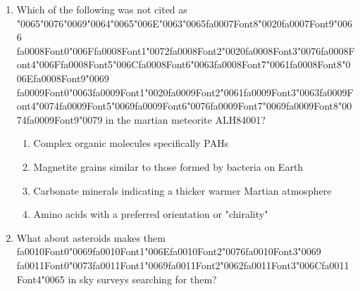 \documentclass[12pt]{article}
\begin{document}
\begin{enumerate}[label=\arabic*.]
\begin{enumerate}[label=(\alph*)]
    \item ancient heavily cratered highlands
    \item dark lavas inside volcanic calderas
    \item dark lavas filling older impact basins
    \item the bright regions on the Moon
\end{enumerate}
\item Which of the following was not cited as {\char"0065}{\char"0076}{\char"0069}{\char"0064}{\char"0065}{\char"006E}{\char"0063}{\char"0065}{\csname fa0007Font8\endcsname\char"0020}{\csname fa0007Font9\endcsname\char"0066} {\csname fa0008Font0\endcsname\char"006F}{\csname fa0008Font1\endcsname\char"0072}{\csname fa0008Font2\endcsname\char"0020}{\csname fa0008Font3\endcsname\char"0076}{\csname fa0008Font4\endcsname\char"006F}{\csname fa0008Font5\endcsname\char"006C}{\csname fa0008Font6\endcsname\char"0063}{\csname fa0008Font7\endcsname\char"0061}{\csname fa0008Font8\endcsname\char"006E}{\csname fa0008Font9\endcsname\char"0069} {\csname fa0009Font0\endcsname\char"0063}{\csname fa0009Font1\endcsname\char"0020}{\csname fa0009Font2\endcsname\char"0061}{\csname fa0009Font3\endcsname\char"0063}{\csname fa0009Font4\endcsname\char"0074}{\csname fa0009Font5\endcsname\char"0069}{\csname fa0009Font6\endcsname\char"0076}{\csname fa0009Font7\endcsname\char"0069}{\csname fa0009Font8\endcsname\char"0074}{\csname fa0009Font9\endcsname\char"0079} in the martian meteorite
ALH84001?
\begin{enumerate}[label=(\alph*)]
    \item Complex organic molecules specifically PAHs
    \item Magnetite grains similar to those formed by bacteria on Earth
    \item Carbonate minerals indicating a thicker warmer Martian atmosphere
    \item Amino acids with a preferred orientation or "chirality"
\end{enumerate}
\item What about asteroids makes them {\csname fa0010Font0\endcsname\char"0069}{\csname fa0010Font1\endcsname\char"006E}{\csname fa0010Font2\endcsname\char"0076}{\csname fa0010Font3\endcsname\char"0069} {\csname fa0011Font0\endcsname\char"0073}{\csname fa0011Font1\endcsname\char"0069}{\csname fa0011Font2\endcsname\char"0062}{\csname fa0011Font3\endcsname\char"006C}{\csname fa0011Font4\endcsname\char"0065} in sky surveys searching for them?

\end{enumerate}
\end{document}
